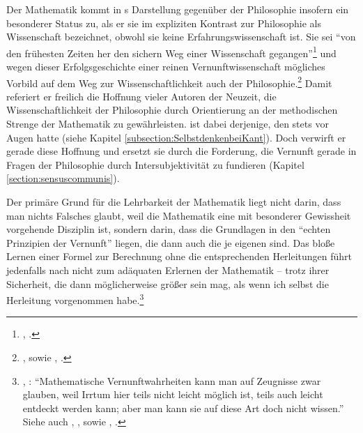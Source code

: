 Der Mathematik kommt in s Darstellung gegenüber der
Philosophie insofern ein besonderer Status zu, als er sie im expliziten Kontrast
zur Philosophie als Wissenschaft bezeichnet, obwohl sie keine Erfahrungswissenschaft ist.
Sie sei \enquote{von den frühesten Zeiten her {\punkt} den sichern Weg einer
Wissenschaft gegangen}\footnote{\cite[][B x]{Kant:KritikderreinenVernunft2003},
\cite[][III: 9.7--9]{Kant:GesammelteWerke1900ff.}.} und wegen dieser
Erfolgsgeschichte einer reinen Vernunftwissenschaft
mögliches Vorbild auf dem Weg zur Wissenschaftlichkeit auch der
Philosophie.\footnote{\cite[Vgl.][\S\S~5\,f.,]{Kant:ProlegomenazueinerjedenkuenftigenMetaphysikdiealsWissenschaftwirdauftretenkoennen1977}
\cite[][IV: 279.15--280.32]{Kant:GesammelteWerke1900ff.}, sowie
\cite[][B 14--17]{Kant:KritikderreinenVernunft2003},
\cite[][III: 36.14--38.24]{Kant:GesammelteWerke1900ff.}.} Damit referiert er
freilich die Hoffnung vieler Autoren der Neuzeit, die Wissenschaftlichkeit der
Philosophie durch Orientierung an der methodischen Strenge der Mathematik zu
gewährleisten.
 ist dabei
derjenige, den  stets vor Augen hatte (siehe Kapitel
\ref{subsection:SelbstdenkenbeiKant}). Doch verwirft er gerade diese Hoffnung
und ersetzt sie durch die Forderung, die Vernunft gerade in Fragen der
Philosophie durch Intersubjektivität zu fundieren (Kapitel
\ref{section:sensuscommunis}).

Der primäre Grund für die Lehrbarkeit der Mathematik liegt nicht darin,
dass man nichts Falsches glaubt, weil die Mathematik eine mit besonderer
Gewissheit vorgehende Disziplin ist, sondern darin, dass die Grundlagen in den
\enquote{echten Prinzipien der Vernunft} liegen, die dann auch die je eigenen
sind. Das bloße Lernen einer Formel zur Berechnung ohne die entsprechenden
Herleitungen führt jedenfalls nach  nicht zum adäquaten
Erlernen der Mathematik -- trotz ihrer Sicherheit, die dann möglicherweise
größer sein mag, als wenn ich selbst die Herleitung vorgenommen
habe.\footnote{\cite[Vgl.][A 105]{Kant:ImmanuelKantsLogik1977}, \cite[][IX:
69.8--10]{Kant:GesammelteWerke1900ff.}: \enquote{Mathematische
Vernunftwahrheiten kann man auf Zeugnisse zwar glauben, weil Irrtum hier teils
nicht leicht möglich ist, teils auch leicht entdeckt werden kann; aber man kann
sie auf diese Art doch nicht wissen.} Siehe auch
\cite[][]{Kant:Reflexionen1900ff.},
\cite[][XVI: 52.2--3]{Kant:GesammelteWerke1900ff.}, sowie
\cite[][]{Kant:Reflexionen1900ff.},
\cite[][XVI: 384.8--10]{Kant:GesammelteWerke1900ff.}.}


